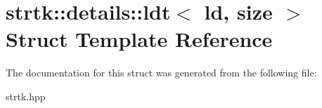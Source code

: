 \hypertarget{structstrtk_1_1details_1_1ldt}{\section{strtk\-:\-:details\-:\-:ldt$<$ ld, size $>$ Struct Template Reference}
\label{structstrtk_1_1details_1_1ldt}
}


The documentation for this struct was generated from the following file\-:\begin{DoxyCompactItemize}
\item 
strtk.\-hpp\end{DoxyCompactItemize}
